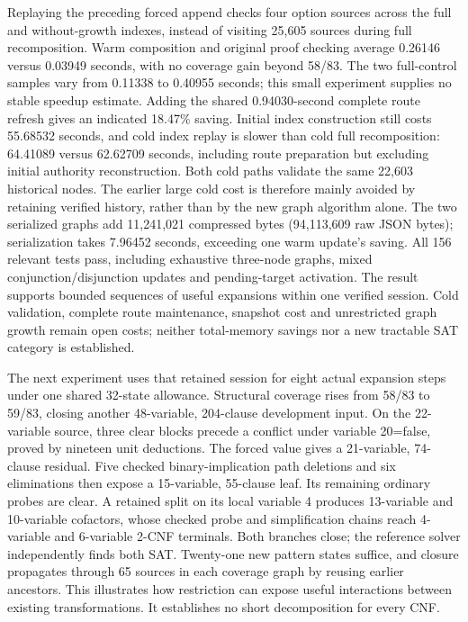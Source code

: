 \documentclass[11pt,a4paper]{article}
\numberwithin{equation}{section}
\theoremstyle{plain}
\theoremstyle{definition}
\theoremstyle{remark}
\begin{document}
Replaying the preceding forced append checks four option sources across the full and without-growth indexes, instead of visiting 25,605 sources during full recomposition. Warm composition and original proof checking average 0.26146 versus 0.03949 seconds, with no coverage gain beyond 58/83. The two full-control samples vary from 0.11338 to 0.40955 seconds; this small experiment supplies no stable speedup estimate. Adding the shared 0.94030-second complete route refresh gives an indicated 18.47\% saving. Initial index construction still costs 55.68532 seconds, and cold index replay is slower than cold full recomposition: 64.41089 versus 62.62709 seconds, including route preparation but excluding initial authority reconstruction. Both cold paths validate the same 22,603 historical nodes. The earlier large cold cost is therefore mainly avoided by retaining verified history, rather than by the new graph algorithm alone. The two serialized graphs add 11,241,021 compressed bytes (94,113,609 raw JSON bytes); serialization takes 7.96452 seconds, exceeding one warm update's saving. All 156 relevant tests pass, including exhaustive three-node graphs, mixed conjunction/disjunction updates and pending-target activation. The result supports bounded sequences of useful expansions within one verified session. Cold validation, complete route maintenance, snapshot cost and unrestricted graph growth remain open costs; neither total-memory savings nor a new tractable SAT category is established.

The next experiment uses that retained session for eight actual expansion steps under one shared 32-state allowance. Structural coverage rises from 58/83 to 59/83, closing another 48-variable, 204-clause development input. On the 22-variable source, three clear blocks precede a conflict under variable 20=false, proved by nineteen unit deductions. The forced value gives a 21-variable, 74-clause residual. Five checked binary-implication path deletions and six eliminations then expose a 15-variable, 55-clause leaf. Its remaining ordinary probes are clear. A retained split on its local variable 4 produces 13-variable and 10-variable cofactors, whose checked probe and simplification chains reach 4-variable and 6-variable 2-CNF terminals. Both branches close; the reference solver independently finds both SAT. Twenty-one new pattern states suffice, and closure propagates through 65 sources in each coverage graph by reusing earlier ancestors. This illustrates how restriction can expose useful interactions between existing transformations. It establishes no short decomposition for every CNF.
\end{document}
